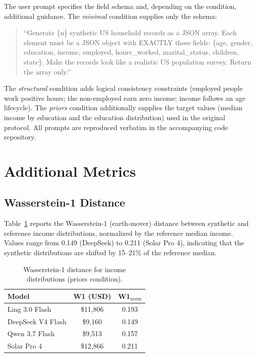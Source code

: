 \documentclass[11pt]{article}
\begin{document}
The user prompt specifies the field schema and, depending on the condition, additional guidance.
The \emph{minimal} condition supplies only the schema:
\begin{quote}
\small
``Generate \{n\} synthetic US household records as a JSON array. Each element must be a JSON object with EXACTLY these fields: \{age, gender, education, income, employed, hours\_worked, marital\_status, children, state\}. Make the records look like a realistic US population survey. Return the array only.''
\end{quote}

The \emph{structural} condition adds logical consistency constraints (employed people work positive hours; the non-employed earn zero income; income follows an age lifecycle).
The \emph{priors} condition additionally supplies the target values (median income by education and the education distribution) used in the original protocol.
All prompts are reproduced verbatim in the accompanying code repository.

\section{Additional Metrics}
\label{app:metrics}

\subsection{Wasserstein-1 Distance}

Table~\ref{tab:wasserstein} reports the Wasserstein-1 (earth-mover) distance between synthetic and reference income distributions, normalized by the reference median income.
Values range from 0.149 (DeepSeek) to 0.211 (Solar Pro 4), indicating that the synthetic distributions are shifted by 15--21\% of the reference median.

\begin{table}[htbp]
\centering
\caption{Wasserstein-1 distance for income distributions (priors condition).}
\label{tab:wasserstein}
\small
\begin{tabular}{lcc}
\toprule
\textbf{Model} & \textbf{W1 (USD)} & \textbf{W1$_\text{norm}$} \\
\midrule
Ling 3.0 Flash    & \$11{,}806 & 0.193 \\
DeepSeek V4 Flash & \$9{,}160  & 0.149 \\
Qwen 3.7 Flash    & \$9{,}513  & 0.157 \\
Solar Pro 4       & \$12{,}866 & 0.211 \\
\bottomrule
\end{tabular}
\end{table}
\end{document}
